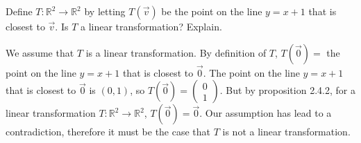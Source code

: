 \documentclass[12pt]{article}
\newenvironment{problem}[2][Problem]
{
	\begin{trivlist} 
		\item[\hskip \labelsep {\bfseries #1 #2:}]
	}
{
	\end{trivlist}
	}
\newenvironment{solution}[1][Solution]
{
	\begin{trivlist} 
		\item[\hskip \labelsep {\itshape #1:}]
	}
	{
	\end{trivlist}
}
\begin{document}
\newpage
\begin{problem}{3}
Define $T:\mathbb{R}^2 \to \mathbb{R}^2$ by letting $T(\vec{v})$ be the point on the line $y=x+1$ that is closest to $\vec{v}$. Is $T$ a linear transformation? Explain.
\noindent
\newline
\newline

\begin{solution}
We assume that $T$ is a linear transformation. By definition of $T$, $T(\vec{0}) =$ the point on the line $y=x+1$ that is closest to $\vec{0}$. The point on the line  $y=x+1$ that is closest to $\vec{0}$ is $(0,1)$, so $T(\vec{0}) = \begin{pmatrix} 0\\1 \end{pmatrix}$. But by proposition 2.4.2, for a linear transformation $T:\mathbb{R}^2 \to \mathbb{R}^2$, $T(\vec{0}) = \vec{0}$. Our assumption has lead to a contradiction, therefore it must be the case that $T$ is not a linear transformation.

\end{solution}
\end{problem}
\end{document}
